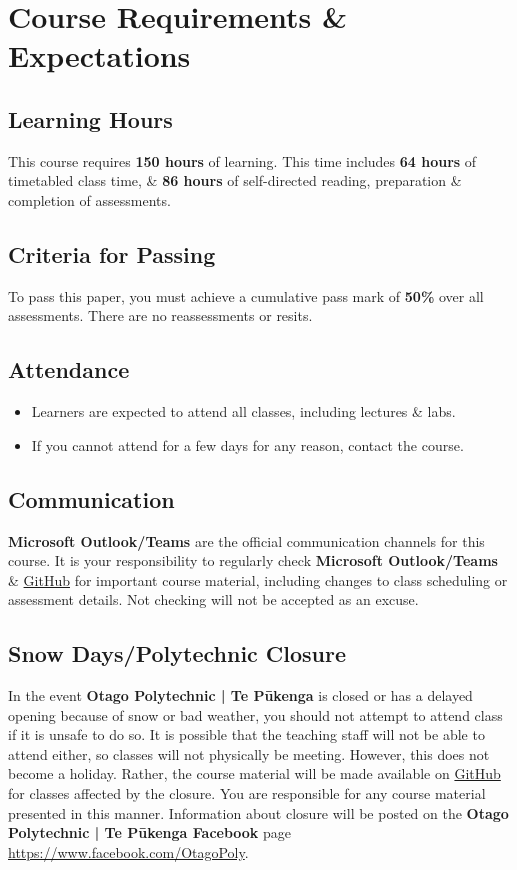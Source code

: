 \documentclass{article}
\begin{document}
\section*{Course Requirements \& Expectations}

\subsection*{Learning Hours}
This course requires \textbf{150 hours} of learning. This time includes \textbf{64 hours} of timetabled class time, \& \textbf{86 hours} of self-directed reading, preparation \& completion of assessments.  

\subsection*{Criteria for Passing}
To pass this paper, you must achieve a cumulative pass mark of \textbf{50\%} over all assessments. There are no reassessments or resits.

\subsection*{Attendance}
\begin{itemize}
	\item Learners are expected to attend all classes, including lectures \& labs.
	\item If you cannot attend for a few days for any reason, contact the course.
\end{itemize}

\subsection*{Communication}
\textbf{Microsoft Outlook/Teams} are the official communication channels for this course. It is your responsibility to regularly check \textbf{Microsoft Outlook/Teams} \& \href{https://github.com/otago-polytechnic-bit-courses/ID607001-intro-app-dev-concepts}{GitHub} for important course material, including changes to class scheduling or assessment details. Not checking will not be accepted as an excuse.

\subsection*{Snow Days/Polytechnic Closure}
In the event \textbf{Otago Polytechnic | Te Pūkenga} is closed or has a delayed opening because of snow or bad weather, you should not attempt to attend class if it is unsafe to do so. It is possible that the teaching staff will not be able to attend either, so classes will not physically be meeting. However, this does not become a holiday. Rather, the course material will be made available on \href{https://github.com/otago-polytechnic-bit-courses/ID607001-intro-app-dev-concepts}{GitHub} for classes affected by the closure. You are responsible for any course material presented in this manner. Information about closure will be posted on the \textbf{Otago Polytechnic | Te Pūkenga Facebook} page \href{https://www.facebook.com/OtagoPoly}{https://www.facebook.com/OtagoPoly}.
\end{document}
